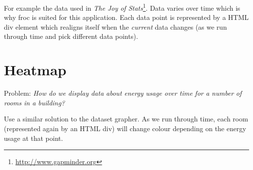 For example the data used in \emph{The Joy of Stats}\footnote{\url{http://www.gapminder.org}}. Data varies over time which is why froc is suited for this application. Each data point is represented by a HTML div element which realigns itself when the \emph{current} data changes (as we run through time and pick different data points).

\section{Heatmap}
Problem: \emph{How do we display data about energy usage over time for a number of rooms in a building?}

Use a similar solution to the dataset grapher. As we run through time, each room (represented again by an HTML div) will change colour depending on the energy usage at that point.
